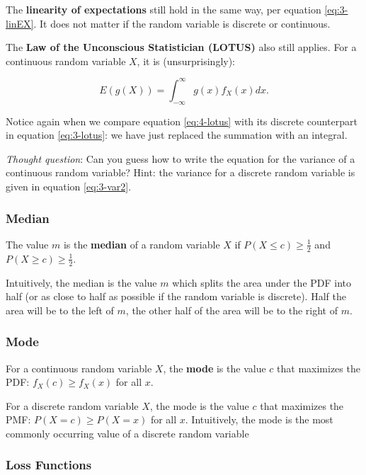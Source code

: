 \documentclass[
]{book}
\begin{document}
The \textbf{linearity of expectations} still hold in the same way, per equation \eqref{eq:3-linEX}. It does not matter if the random variable is discrete or continuous.

The \textbf{Law of the Unconscious Statistician (LOTUS)} also still applies. For a continuous random variable \(X\), it is (unsurprisingly):

\begin{equation} 
E(g(X)) = \int_{-\infty}^{\infty} g(x) f_X(x) dx.
\label{eq:4-lotus}
\end{equation}

Notice again when we compare equation \eqref{eq:4-lotus} with its discrete counterpart in equation \eqref{eq:3-lotus}: we have just replaced the summation with an integral.

\emph{Thought question}: Can you guess how to write the equation for the variance of a continuous random variable? Hint: the variance for a discrete random variable is given in equation \eqref{eq:3-var2}.

\hypertarget{median-1}{%
\subsubsection{Median}\label{median-1}}

The value \(m\) is the \textbf{median} of a random variable \(X\) if \(P(X \leq c) \geq \frac{1}{2}\) and \(P(X \geq c) \geq \frac{1}{2}\).

Intuitively, the median is the value \(m\) which splits the area under the PDF into half (or as close to half as possible if the random variable is discrete). Half the area will be to the left of \(m\), the other half of the area will be to the right of \(m\).

\hypertarget{mode-1}{%
\subsubsection{Mode}\label{mode-1}}

For a continuous random variable \(X\), the \textbf{mode} is the value \(c\) that maximizes the PDF: \(f_X(c) \geq f_X(x)\) for all \(x\).

For a discrete random variable \(X\), the mode is the value \(c\) that maximizes the PMF: \(P(X=c) \geq P(X=x)\) for all \(x\). Intuitively, the mode is the most commonly occurring value of a discrete random variable

\hypertarget{lossfunc}{%
\subsubsection{Loss Functions}\label{lossfunc}}
\end{document}
